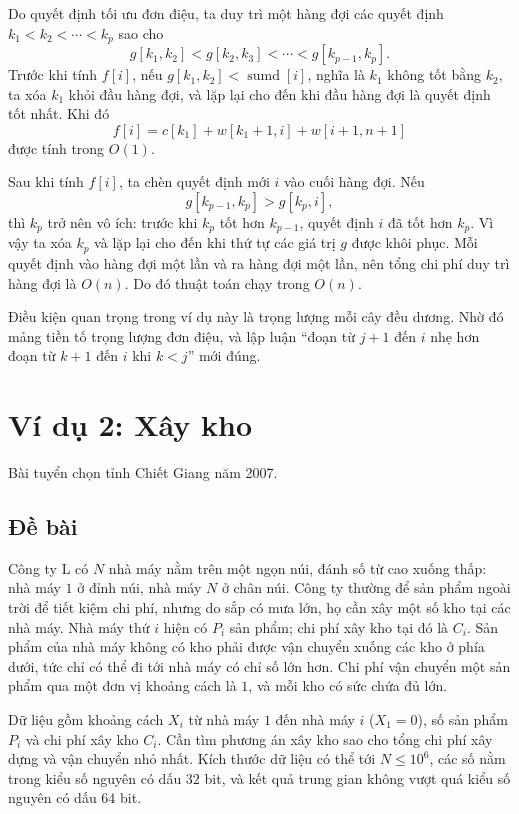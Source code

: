 \documentclass[11pt]{article}
\begin{document}
Do quyết định tối ưu đơn điệu, ta duy trì một hàng đợi các quyết định
$k_1<k_2<\cdots<k_p$ sao cho
\[
  g[k_1,k_2]<g[k_2,k_3]<\cdots<g[k_{p-1},k_p].
\]
Trước khi tính $f[i]$, nếu
$g[k_1,k_2]<\operatorname{sumd}[i]$, nghĩa là $k_1$ không tốt bằng $k_2$,
ta xóa $k_1$ khỏi đầu hàng đợi, và lặp lại cho đến khi đầu hàng đợi là quyết
định tốt nhất. Khi đó
\[
  f[i]=c[k_1]+w[k_1+1,i]+w[i+1,n+1]
\]
được tính trong $O(1)$.

Sau khi tính $f[i]$, ta chèn quyết định mới $i$ vào cuối hàng đợi. Nếu
\[
  g[k_{p-1},k_p]>g[k_p,i],
\]
thì $k_p$ trở nên vô ích: trước khi $k_p$ tốt hơn $k_{p-1}$, quyết định $i$
đã tốt hơn $k_p$. Vì vậy ta xóa $k_p$ và lặp lại cho đến khi thứ tự các giá
trị $g$ được khôi phục. Mỗi quyết định vào hàng đợi một lần và ra hàng đợi
một lần, nên tổng chi phí duy trì hàng đợi là $O(n)$. Do đó thuật toán chạy
trong $O(n)$.

Điều kiện quan trọng trong ví dụ này là trọng lượng mỗi cây đều dương. Nhờ
đó mảng tiền tố trọng lượng đơn điệu, và lập luận ``đoạn từ $j+1$ đến $i$
nhẹ hơn đoạn từ $k+1$ đến $i$ khi $k<j$'' mới đúng.

\section{Ví dụ 2: Xây kho}

Bài tuyển chọn tỉnh Chiết Giang năm 2007.

\subsection*{Đề bài}

Công ty L có $N$ nhà máy nằm trên một ngọn núi, đánh số từ cao xuống thấp:
nhà máy $1$ ở đỉnh núi, nhà máy $N$ ở chân núi. Công ty thường để sản phẩm
ngoài trời để tiết kiệm chi phí, nhưng do sắp có mưa lớn, họ cần xây một số
kho tại các nhà máy. Nhà máy thứ $i$ hiện có $P_i$ sản phẩm; chi phí xây kho
tại đó là $C_i$. Sản phẩm của nhà máy không có kho phải được vận chuyển
xuống các kho ở phía dưới, tức chỉ có thể đi tới nhà máy có chỉ số lớn hơn.
Chi phí vận chuyển một sản phẩm qua một đơn vị khoảng cách là $1$, và mỗi kho
có sức chứa đủ lớn.

Dữ liệu gồm khoảng cách $X_i$ từ nhà máy $1$ đến nhà máy $i$ ($X_1=0$), số
sản phẩm $P_i$ và chi phí xây kho $C_i$. Cần tìm phương án xây kho sao cho
tổng chi phí xây dựng và vận chuyển nhỏ nhất. Kích thước dữ liệu có thể tới
$N\le 10^6$, các số nằm trong kiểu số nguyên có dấu $32$ bit, và kết quả
trung gian không vượt quá kiểu số nguyên có dấu $64$ bit.
\end{document}
